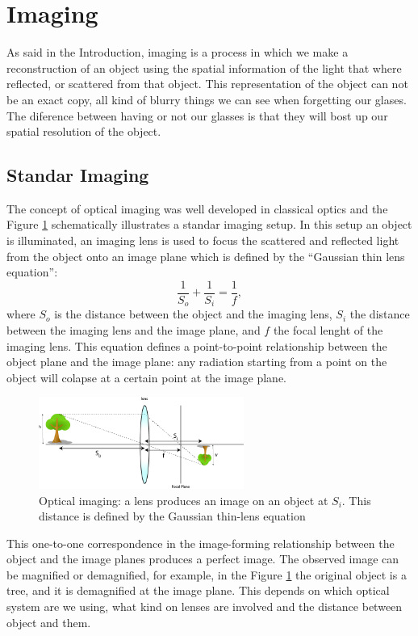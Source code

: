 \section{Imaging}
  
As said in the Introduction, imaging is a process in which we make a reconstruction 
of an object using the spatial information of the light that where reflected, or scattered
from that object. This representation of the object can not be an exact copy, all
kind of blurry things we can see when forgetting our glases. The diference between 
having or not our glasses is that they will bost up our spatial resolution of the object.



\subsection{Standar Imaging}


The concept of optical imaging was well developed in classical optics and the Figure
\ref{fig:imaging} schematically illustrates a standar imaging setup. In this setup 
an object is illuminated, an imaging lens is used 
to focus the scattered and reflected light from the object onto an image plane 
which is defined by the “Gaussian thin lens equation”\cite{hecht}:
\begin{equation}
\frac{1}{S_o}+\frac{1}{S_i}=\frac{1}{f},
\end{equation}
 where $S_o$ is the distance between the object and the imaging lens, $S_i$ the distance 
between the imaging lens and the image plane, and $f$ the focal lenght of the imaging lens. This equation defines
a point-to-point relationship between the object plane and the image plane: any radiation starting from a point on the object will colapse at a certain point at the image plane.
\\
\begin{figure}[h!]
\centering
\includegraphics[width=0.6\textwidth]{Figures/imaging.png}
\caption{Optical imaging: a lens produces an image on an object at $S_i$. This distance is defined
by the Gaussian thin-lens equation} 
\label{fig:imaging}
\end{figure}
This one-to-one correspondence in the image-forming relationship between the object and the image planes produces a perfect image.
The observed image can be magnified or demagnified, for example, in the 
Figure \ref{fig:imaging} the original object is a tree, and it is demagnified at the image plane. This depends on which optical 
system are we using, what kind on lenses are involved and the distance between object and them.



